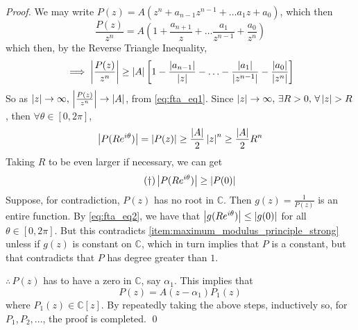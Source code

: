 \documentclass[notoc,notitlepage]{tufte-book}
\begin{document}
\begin{enumerate}
 	\begin{proof}
 		We may write $P(z) = A(z^n + a_{n - 1} z^{n - 1} + \hdots a_1 z + a_0)$, which then
 		\begin{equation*}
 			\frac{P(z)}{z^n} = A \left(1 + \frac{a_{n + 1}}{z} + \hdots \frac{a_1}{z^{n-1}} + \frac{a_0}{z^n} \right)
 		\end{equation*}
 		which then, by the Reverse Triangle Inequality,
 		\begin{equation}\label{eq:fta_eq1}
 			\implies \left|\frac{P(z)}{z^n} \right| \geq \left|A\right| \left[1 - \frac{\left|a_{n - 1}\right|}{\left|z\right|} - \hdots - \frac{\left|a_1\right|}{\left|z^{n - 1}\right|} - \frac{\left|a_0\right|}{\left|z^n\right|} \right]
 		\end{equation}
 		So as $\left|z\right| \to \infty, \, \left|\frac{P(z)}{z^n} \right| \to \left|A\right|$, from \cref{eq:fta_eq1}. Since $\left|z\right| \to \infty, \, \exists R > 0, \, \forall \left|z\right| > R$, then $\forall \theta \in [0, 2 \pi]$,
 		\begin{equation*}
 			\left|P(Re^{i \theta})\right| = \left|P(z)\right| \geq \frac{\left|A\right|}{2} \left|z\right|^n \geq \frac{\left|A\right|}{2} R^n 
 		\end{equation*}
 		Taking $R$ to be even larger if necessary, we can get
 		\begin{equation}\tag{$\dagger$}\label{eq:fta_eq2}
 			\left|{P(Re^{i \theta})}\right| \geq \left|P(0)\right|
 		\end{equation}
 		Suppose, for contradiction, $P(z)$ has no root in $\mathbb{C}$. Then $g(z) = \frac{1}{P(z)}$ is an entire function. By \cref{eq:fta_eq2}, we have that $\left|g(Re^{i \theta})\right| \leq \left|g(0)\right|$ for all $\theta \in [0, 2 \pi]$. But this contradicts \cref{item:maximum_modulus_principle_strong} unless if $g(z)$ is constant on $\mathbb{C}$, which in turn implies that $P$ is a constant, but that contradicts that $P$ has degree greater than $1$.

 		$\therefore \, P(z)$ has to have a zero in $\mathbb{C}$, say $\alpha_1$. This implies that
 		\begin{equation*}
 			P(z) = A (z - \alpha_1) P_1 (z)
 		\end{equation*}
 		where $P_1(z) \in \mathbb{C} [z]$. By repeatedly taking the above steps, inductively so, for $P_1, P_2, ...$, the proof is completed. \qed
 	\end{proof}
\end{enumerate}


\end{document}
